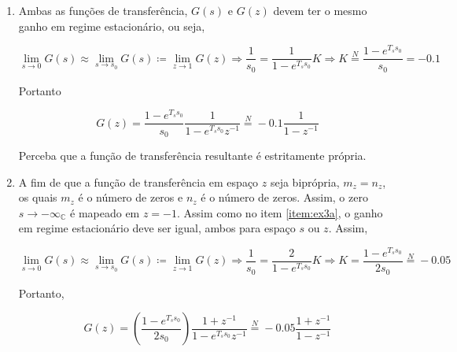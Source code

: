 \documentclass[twoside, fleqn]{article}
\begin{document}
        \begin{enumerate}
        
        \item \label{item:ex3a}
        
        Ambas as funções de transferência, $G(s)$ e $G(z)$ devem ter o mesmo ganho em regime estacionário, ou seja,
        
            \begin{equation}
                \lim\limits_{s \rightarrow 0} G(s) \approx  \lim\limits_{s \rightarrow s_0} G(s) \coloneqq \lim\limits_{z \rightarrow 1} G(z) \Rightarrow \frac{1}{s_0} = \frac{1}{1 - e^{T_s s_0}} K \Rightarrow K \stackrel{N}{=} \frac{1 - e^{T_s s_0}}{s_0} = - 0.1
            \end{equation}
        
        Portanto
        
            \begin{equation}
                G(z) = \frac{1 - e^{T_s s_0}}{s_0} \frac{1}{1 - e^{T_s s_0} z^{-1}} \stackrel{N}{=} -0.1 \frac{1}{1 - z^{-1}}
            \end{equation}
        
        Perceba que a função de transferência resultante é estritamente própria.
        
        \item %
        
        A fim de que a função de transferência em espaço $z$ seja biprópria, $m_z = n_z$, os quais $m_z$ é o número de zeros e $n_z$ é o número de zeros. Assim, o zero $s \rightarrow - \infty_{\mathbb{C}}$ é mapeado em $z = -1$. Assim como no item \ref{item:ex3a}, o ganho em regime estacionário deve ser igual, ambos para espaço $s$ ou $z$. Assim,
        
            \begin{equation}
                \lim\limits_{s \rightarrow 0} G(s) \approx  \lim\limits_{s \rightarrow s_0} G(s) \coloneqq \lim\limits_{z \rightarrow 1} G(z) \Rightarrow  \frac{1}{s_0} = \frac{2}{1 - e^{T_s s_0}} K \Rightarrow K = \frac{1 - e^{T_s s_0}}{2 s_0} \stackrel{N}{=} - 0.05
            \end{equation}
        
        Portanto,
        
            \begin{equation}
                G(z) =  \left( \frac{1 - e^{T_s s_0}}{2 s_0}\right) \frac{1+z^{-1}}{1 - e^{T_s s_0}  z^{-1}} \stackrel{N}{=} -0.05 \frac{1+z^{-1}}{1 - z^{-1}}
            \end{equation}
    \end{enumerate}
\end{document}
